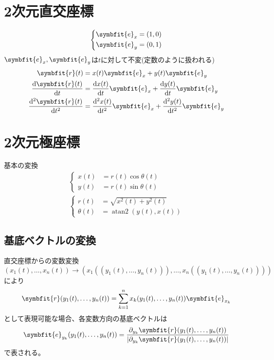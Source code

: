 \documentclass[12pt]{jlreq}
\DeclareMathOperator{\atantwo}{atan2}
\newcommand{\bm}[1]{\symbfit{#1}}
\begin{document}
\section{2次元直交座標}
\begin{gather*}
    \left\{
        \begin{aligned}
            \bm{e}_x&=\left(1,0\right)\\
            \bm{e}_y&=\left(0,1\right)
        \end{aligned}
    \right.
\end{gather*}
\(\bm{e}_x,\bm{e}_y\)は\(t\)に対して不変(定数のように扱われる)\\
\begin{align*}
\bm{r}(t)&=x(t)\bm{e}_x+y(t)\bm{e}_{y}\\
\odv{\bm{r}(t)}{t}&=\odv{x(t)}{t}\bm{e}_x+\odv{y(t)}{t}\bm{e}_{y}\\
\odv[2]{\bm{r}(t)}{t}&=\odv[2]{x(t)}{t}\bm{e}_x+\odv[2]{y(t)}{t}\bm{e}_{y}
\end{align*}
\section{2次元極座標}
基本の変換
\begin{gather*}
    \left\{
        \begin{aligned}
            x(t)&=r(t)\cos\theta(t)\\
            y(t)&=r(t)\sin\theta(t)
        \end{aligned}
    \right.\\
    \left\{
        \begin{aligned}
            r(t)&=\sqrt{x^2(t)+y^2(t)}\\
            \theta(t)&=\atantwo\left(y(t),x(t)\right)
        \end{aligned}
    \right.
\end{gather*}
\subsection{基底ベクトルの変換}
直交座標からの変数変換
\[
(x_1(t),\dots,x_n(t))\to(x_1((y_1(t),\dots,y_n(t))),\dots,x_n((y_1(t),\dots,y_n(t))))
\]
により\[\bm{r}(y_1(t),\dots,y_n(t))=\displaystyle\sum_{k=1}^{n}x_k(y_1(t),\dots,y_n(t))\bm{e}_{x_k}\]として表現可能な場合、各変数方向の基底ベクトルは
\begin{equation*}
    \bm{e}_{y_k}(y_1(t),\dots,y_n(t))=\frac{\pdif{y_k}\bm{r}(y_1(t),\dots,y_n(t))}{\left|\pdif{y_k}\bm{r}(y_1(t),\dots,y_n(t))\right|}
\end{equation*}
で表される。
\end{document}
